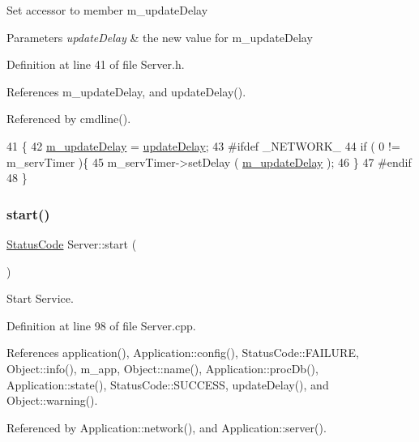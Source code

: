 Set accessor to member m\+\_\+update\+Delay 
\begin{DoxyParams}{Parameters}
{\em update\+Delay} & the new value for m\+\_\+update\+Delay \\
\hline
\end{DoxyParams}


Definition at line 41 of file Server.\+h.



References m\+\_\+update\+Delay, and update\+Delay().



Referenced by cmdline().


\begin{DoxyCode}
41                                         \{
42     \hyperlink{classServer_ae991d55181bff0552a34278ea9f76735}{m\_updateDelay} = \hyperlink{classServer_ac3b91a1bf06dab7911e6d1b867d677bc}{updateDelay};
43 \textcolor{preprocessor}{#ifdef \_NETWORK\_}
44     \textcolor{keywordflow}{if} ( 0 != m\_servTimer )\{
45       m\_servTimer->setDelay ( \hyperlink{classServer_ae991d55181bff0552a34278ea9f76735}{m\_updateDelay} );
46     \}
47 \textcolor{preprocessor}{#endif}
48   \}
\end{DoxyCode}
\mbox{\label{classServer_a039cc5b24c26fa5bb8145335f27bb28e}} 
\subsubsection{\texorpdfstring{start()}{start()}}
{\footnotesize\ttfamily \hyperlink{classStatusCode}{Status\+Code} Server\+::start (\begin{DoxyParamCaption}{ }\end{DoxyParamCaption})}



Start Service. 



Definition at line 98 of file Server.\+cpp.



References application(), Application\+::config(), Status\+Code\+::\+F\+A\+I\+L\+U\+RE, Object\+::info(), m\+\_\+app, Object\+::name(), Application\+::proc\+Db(), Application\+::state(), Status\+Code\+::\+S\+U\+C\+C\+E\+SS, update\+Delay(), and Object\+::warning().



Referenced by Application\+::network(), and Application\+::server().


